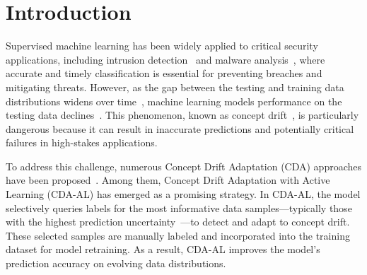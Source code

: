 \documentclass[lettersize,journal]{IEEEtran}
\begin{document}
\section{Introduction}
\label{Sec: Introduction}
Supervised machine learning has been widely applied to critical security applications, including intrusion detection~\cite{yang2024recda} and malware analysis~\cite{fernando2024fesad}, where accurate and timely classification is essential for preventing breaches and mitigating threats.
However, as the gap between the testing and training data distributions widens over time~\cite{park2016active}, machine learning models performance on the testing data declines~\cite{malekghaini2023deep}.
This phenomenon, known as concept drift~\cite{2018-CCF-A-concept-drift-A-review,2024-1Q-An-overview-CDA,2024-1Q-survey-CDA}, is particularly dangerous because it can result in inaccurate predictions and potentially critical failures in high-stakes applications.

To address this challenge, numerous Concept Drift Adaptation (CDA) approaches have been proposed~\cite{2023-Q1-Concept-drift-handling,2023-Detecting-group-concept-drift-from-multiple-data-streams-1qu,aaaiYuLZ024}. 
Among them, Concept Drift Adaptation with Active Learning (CDA-AL)\cite{2023-Usenix-chenyizhen,liu2021comprehensive,krawczyk2018combining} has emerged as a promising strategy. 
In CDA-AL, the model selectively queries labels for the most informative data samples—typically those with the highest prediction uncertainty~\cite{ren2021survey,2023-Usenix-chenyizhen}—to detect and adapt to concept drift. 
These selected samples are manually labeled and incorporated into the training dataset for model retraining. 
As a result, CDA-AL improves the model's prediction accuracy on evolving data distributions.
\end{document}
